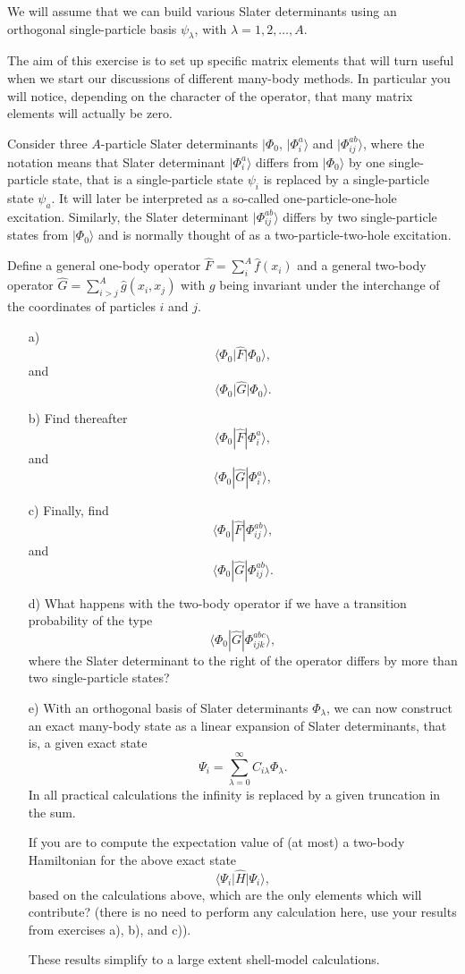 \begin{prob}\label{problem:hamiltoniansetup}
We will assume that we can build various Slater determinants using an orthogonal  single-particle basis $\psi_{\lambda}$, 
with $\lambda = 1,2,\dots,A$. 


The aim of this exercise is to set up specific matrix elements that will turn useful when we start our discussions of different many-body methods. In particular you will notice, depending on the character of the operator, that many matrix elements will actually be zero.

Consider three $A$-particle  Slater determinants  $|\Phi_0$, $|\Phi_i^a\rangle$ and $|\Phi_{ij}^{ab}\rangle$, where the notation means that 
Slater determinant $|\Phi_i^a\rangle$ differs from $|\Phi_0\rangle$ by one single-particle state, that is a single-particle
state $\psi_i$ is replaced by a single-particle state $\psi_a$. 
It will later be interpreted as a so-called one-particle-one-hole excitation.
Similarly, the Slater determinant $|\Phi_{ij}^{ab}\rangle$
differs by two single-particle states from $|\Phi_0\rangle$ and is normally thought of as a two-particle-two-hole excitation.

Define a general one-body operator $\hat{F} = \sum_{i}^A\hat{f}(x_{i})$ and a general  two-body operator $\hat{G}=\sum_{i>j}^A\hat{g}(x_{i},x_{j})$ with $g$ being invariant under the interchange of the coordinates of particles $i$ and $j$. 
\begin{enumerate}
\item[a)]
\[
\langle \Phi_0 \vert\hat{F}\vert\Phi_0\rangle,
\]
and
\[
\langle \Phi_0\vert\hat{G}|\Phi_0\rangle.
\]
\item[b)]
Find thereafter 
\[
\langle \Phi_0 |\hat{F}|\Phi_i^a\rangle,
\]
and
\[
\langle \Phi_0|\hat{G}|\Phi_i^a\rangle,
\]
\item[c)]
Finally, find
\[
\langle \Phi_0 |\hat{F}|\Phi_{ij}^{ab}\rangle,
\]
and
\[
\langle \Phi_0|\hat{G}|\Phi_{ij}^{ab}\rangle.
\]
\item[d)]
What happens with the two-body operator if we have a transition probability  of the type
\[
\langle \Phi_0|\hat{G}|\Phi_{ijk}^{abc}\rangle,
\]
where the Slater determinant to the right of the operator differs by more than two single-particle states?
\item[e)]
With an orthogonal basis of Slater determinants $\Phi_{\lambda}$, we can now construct an exact many-body state as a linear expansion of Slater determinants, that is, a given exact state
\[
\Psi_i = \sum_{\lambda =0}^{\infty}C_{i\lambda}\Phi_{\lambda}.
\]
In all practical calculations the infinity is replaced by a given truncation in the sum. 

If you are to compute the expectation value of (at most) a two-body Hamiltonian for the above
exact state
\[
\langle \Psi_i \vert \hat{H} \vert \Psi_i\rangle,
\]
based on the calculations above, which are the only elements which will contribute?  (there is no need to perform any calculation here, use your results from exercises a), b), and c)).

These results simplify to a large extent shell-model calculations. 
\end{enumerate}
\end{prob}
